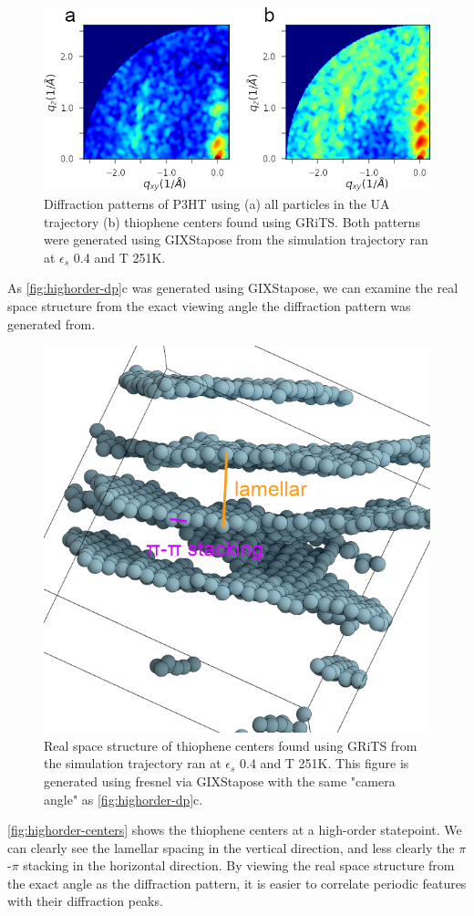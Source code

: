 \begin{figure}
    \centering
    \includegraphics[width=0.8\linewidth]{figures/p3ht_val/ua_vs_cg_dp.png}
    \caption{Diffraction patterns of P3HT using (a) all particles in the UA trajectory (b) thiophene centers found using GRiTS. Both patterns were generated using GIXStapose from the simulation trajectory ran at $\epsilon_{s}$ 0.4 and T 251K.}\label{fig:ua-vs-cg-dp}
\end{figure}

As \autoref{fig:highorder-dp}c was generated using GIXStapose, we can examine the real space structure from the exact viewing angle the diffraction pattern was generated from. 
\begin{figure}
    \centering
    \includegraphics[width=0.8\linewidth]{figures/p3ht_val/scene_annotated.png}
    \caption{Real space structure of thiophene centers found using GRiTS from the simulation trajectory ran at $\epsilon_{s}$ 0.4 and T 251K. This figure is generated using fresnel via GIXStapose with the same "camera angle" as \autoref{fig:highorder-dp}c. }\label{fig:highorder-centers}
\end{figure}
\autoref{fig:highorder-centers} shows the thiophene centers at a high-order statepoint. We can clearly see the lamellar spacing in the vertical direction, and less clearly the $\pi$-$\pi$ stacking in the horizontal direction. By viewing the real space structure from the exact angle as the diffraction pattern, it is easier to correlate periodic features with their diffraction peaks.

